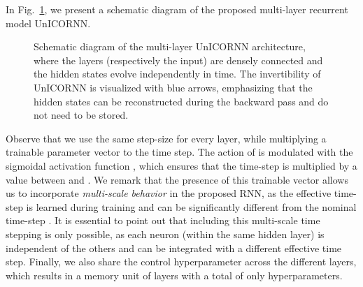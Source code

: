 \documentclass{article}
\newcommand{\fref}[1] {Fig.~\ref{#1}}
\begin{document}
In \fref{fig:diagram}, we present a schematic diagram of the proposed multi-layer recurrent model UnICORNN.
\begin{figure}[ht]
\vskip 0.2in
\begin{center}
\begin{minipage}{.35\textwidth}
\end{minipage}
\caption{Schematic diagram of the multi-layer UnICORNN architecture, where the layers (respectively the input) are densely connected and the hidden states evolve independently in time. The invertibility of UnICORNN is visualized with blue arrows, emphasizing that the hidden states can be reconstructed during the backward pass and do not need to be stored.}
\label{fig:diagram}
\end{center}
\vskip -0.2in
\end{figure}

Observe that we use the same step-size  for every layer, while multiplying a trainable parameter vector  to the time step. The action of  is modulated with the sigmoidal activation function , which ensures that the time-step  is multiplied by a value between  and . We remark that the presence of this trainable vector  allows us to incorporate \emph{multi-scale behavior} in the proposed RNN, as the effective time-step is learned during training and can be significantly different from the nominal time-step . It is essential to point out that including this multi-scale time stepping is only possible, as each neuron (within the same hidden layer) is independent of the others and can be integrated with a different effective time step. Finally, we also share the control hyperparameter  across the different layers, which results in a memory unit of  layers with a total of only  hyperparameters. 
\end{document}
